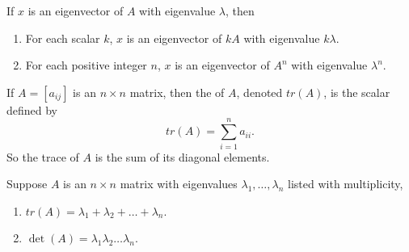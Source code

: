 \begin{theorem}
  If $x$ is an eigenvector of $A$ with eigenvalue $\lambda$, then
  \begin{enumerate}
    \item For each scalar $k$, $x$ is an eigenvector of $kA$ with eigenvalue $k \lambda$.
    \item For each positive integer $n$, $x$ is an eigenvector of $A^{n}$ with eigenvalue $\lambda^{n}$.
  \end{enumerate}
\end{theorem}

\begin{definition}
  If $A = \left[a_{ij}\right]$ is an $n \times n$ matrix, then the  of $A$, denoted $tr(A)$, is the scalar defined by
  \begin{equation*}
    tr(A) = \sum^{n}_{i = 1} a_{ii}.
  \end{equation*}
  So the trace of $A$ is the sum of its diagonal elements.
\end{definition}

\begin{theorem}
  Suppose $A$ is an $n \times n$ matrix with eigenvalues $\lambda_{1}, \dots, \lambda_{n}$ listed with multiplicity,
  \begin{enumerate}
    \item $tr(A) = \lambda_{1} + \lambda_{2} + \dots + \lambda_{n}$.
    \item $\det(A) = \lambda_{1} \lambda_{2} \dots \lambda_{n}$.
  \end{enumerate}
\end{theorem}



